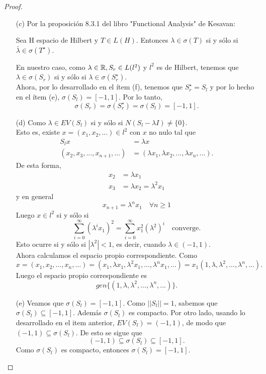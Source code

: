 \begin{proof}
\begin{enumerate}
    \item[(c)] Por la proposición 8.3.1 del libro "Functional Analysis" de Kesavan:
\begin{theorem}[Proposición 8.3.1]
    
Sea H espacio de Hilbert y $T\in L(H)$. Entonces $\lambda\in\sigma(T)$ si y sólo si $\bar{\lambda}\in\sigma(T^{\star})$.
\end{theorem}
En nuestro caso, como $\lambda \in \mathbb{R} ,S_r \in L(l^2)$ y $l^2$ es de Hilbert, tenemos que $\lambda\in\sigma(S_r)$ si y sólo si $\lambda\in\sigma(S_r^{\star})$. \\
Ahora, por lo desarrollado en el ítem (f), tenemos que $S_{r}^{\star}=S_l$ y por lo hecho en el ítem (e), $\sigma(S_l)=[-1,1]$. Por lo tanto, \[\sigma(S_{r})=\sigma(S_{r}^{\star})=\sigma(S_{l})=[-1,1].\]
\item[(d)] Como $\lambda\in EV(S_{l})$ si y sólo si $N(S_{l}-\lambda I)\ne\{0\}$. \\
Esto es, existe $x=(x_{1},x_{2},...)\in l^{2}$ con $x$ no nulo tal que \begin{align*}
S_{l}x&=\lambda x \\
 (x_{2},x_{3},...,x_{n+1},...)&=(\lambda x_{1},\lambda x_{2},...,\lambda x_{n},...).\end{align*}
De esta forma,
\begin{align*}
x_{2}&=\lambda x_{1} \\
x_{3}&=\lambda x_{2}=\lambda^{2}x_{1}
\end{align*}
y en general
\[x_{n+1}=\lambda^{n}x_{1} \quad \forall n \geq 1\]
Luego $x\in l^{2}$ si y sólo si \[\sum_{i=0}^{\infty}(\lambda^{i}x_{1})^{2} = \sum_{i=0}^{\infty}x_1^{2}(\lambda^{2})^{i} \quad \text{converge.}\]
Esto ocurre si y sólo si $|\lambda^{2}|<1$, es decir, cuando $\lambda\in (-1,1)$. \\
Ahora calculamos el espacio propio correspondiente.
Como \[x=(x_{1},x_{2},...,x_{n},...)=(x_{1},\lambda x_{1},\lambda^{2}x_{1},...,\lambda^{n}x_{1},...)
=x_{1}(1,\lambda,\lambda^{2},...,\lambda^{n},...).\]
Luego el espacio propio correspondiente es \[gen\{(1,\lambda,\lambda^{2},...,\lambda^{n},...)\}.\]
\item[(e)] Veamos que $\sigma(S_l)=[-1,1]$. Como $||S_{l}||=1$, sabemos que $\sigma(S_{l})\subseteq[-1,1]$.
Además $\sigma(S_{l})$ es compacto.
Por otro lado, usando lo desarrollado en el item anterior, $EV(S_l)=(-1,1)$, de modo que $(-1,1)\subseteq\sigma(S_l)$.
De esto se sigue que\[(-1,1)\subseteq\sigma(S_l)\subseteq[-1,1].\] Como $\sigma(S_{l})$ es compacto, entonces $\sigma(S_l)=[-1,1]$.

\end{enumerate}
\end{proof}
